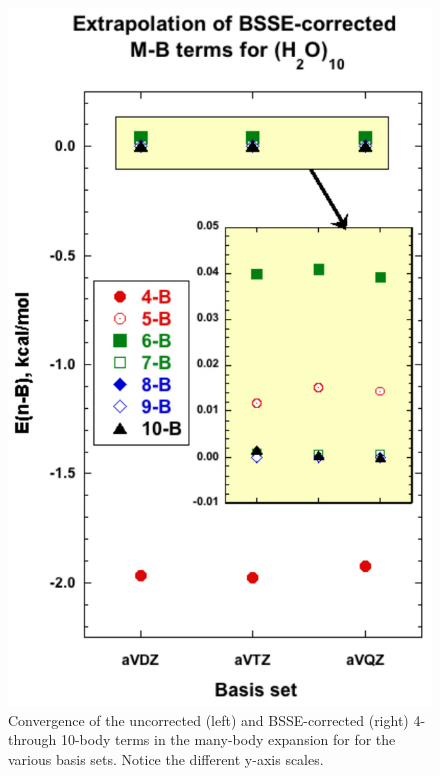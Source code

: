 \documentclass[11pt, proquest]{uwthesis}[2020/02/24]
\let\ce\ch
\begin{document}
\begin{figure}[t]
\begin{center}
\begin{minipage}{0.45\textwidth}
\includegraphics[width=.9\textwidth]{Figures/Chapter_2/MB_extrap_w10_BSSE_all.pdf}
\end{minipage}
\end{center}
\label{fig:MBE_I_F3}
\caption[temp]{Convergence of the uncorrected (left) and BSSE-corrected (right) 4- through 10-body terms in the many-body expansion for \ce{(H2O)_{10}} for the various basis sets. Notice the different y-axis scales.}
\end{figure}
\end{document}
